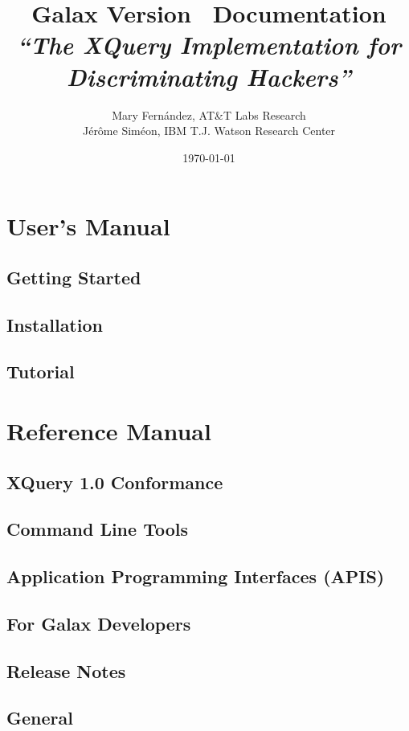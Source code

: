 \documentclass{book}[11pt]
\title{\Large\bf {\LARGE Galax Version
\version\ Documentation}\\[0.5cm] \textit{``The XQuery Implementation
for Discriminating Hackers''}}
\author{Mary Fern\'andez, AT\&T Labs Research \\ J\'er\^ome Sim\'eon, IBM T.J. Watson Research Center}
\date{\today}
\newcommand{\eat}[1]{}
\begin{document}
\maketitle
\tableofcontents

\part{User's Manual}
\chapter{Getting Started}
\label{sec:readme}


\chapter{Installation}
\label{sec:install}


\chapter{Tutorial}
\label{sec:tutorial}


\part{Reference Manual}

\chapter{XQuery 1.0 Conformance}
\label{sec:alignment}


\chapter{Command Line Tools}
\label{sec:commandline}


\chapter{Application Programming Interfaces (APIS)}
\label{sec:api}


\eat{
\chapter{Accessing and Storing XML}
\label{sec:documents}
\cutname{documents.html}

}

\chapter{For Galax Developers}
\label{sec:developers}


\chapter{Release Notes}
\label{sec:releasenotes}


\chapter{General}
\label{sec:general}

\end{document}
